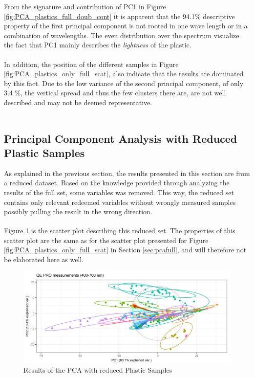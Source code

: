 \noindent
From the signature and contribution of PC1 in Figure \ref{fig:PCA_plastics_full_doub_cont} it is apparent that the 94.1\% descriptive property of the first principal component is not rooted in one wave length or in a combination of wavelengths. The even distribution over the spectrum visualize the fact that PC1 mainly describes the \textit{lightness} of the plastic. 
\\\\
In addition, the position of the different samples in Figure \ref{fig:PCA_plastics_only_full_scat}, also indicate that the results are dominated by this fact. Due to the low variance of the second principal component, of only 3.4 \%, the vertical spread and thus the few clusters there are, are not well described and may not be deemed representative.
\\\\

\subsection{Principal Component Analysis with Reduced Plastic Samples}
As explained in the previous section, the results presented in this section are from a reduced dataset. Based on the knowledge provided through analyzing the results of the full set, some variables was removed. This way, the reduced set contains only relevant redeemed variables without wrongly measured samples possibly pulling the result in the wrong direction. 
\\\\
Figure \ref{fig:PCA_plastics_reduced_only_scat} is the scatter plot describing this reduced set. The properties of this scatter plot are the same as for the scatter plot presented for Figure \ref{fig:PCA_plastics_only_full_scat} in Section \ref{sec:pcafull}, and will therefore not be elaborated here as well.

\begin{figure}[H]
    \centering
    \includegraphics[width=1\textwidth]{Images/results/PCA_plastics_reduced_only_scat.png}
    \caption{Results of the PCA with reduced Plastic Samples}
    \label{fig:PCA_plastics_reduced_only_scat}
\end{figure}

